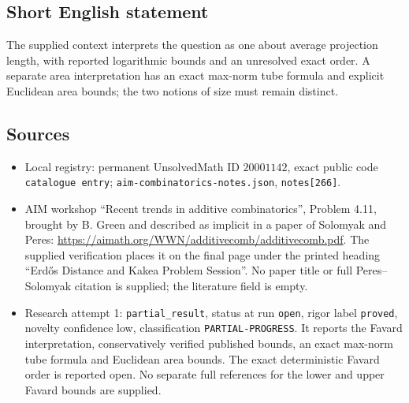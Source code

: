 \documentclass[11pt]{article}
\begin{document}
\subsection{Short English statement}
The supplied context interprets the question as one about average projection length, with reported logarithmic bounds and an unresolved exact order. A separate area interpretation has an exact max-norm tube formula and explicit Euclidean area bounds; the two notions of size must remain distinct.
\subsection{Sources}
\begin{itemize}
\item Local registry: permanent UnsolvedMath ID \(20001142\), exact public code \texttt{catalogue entry}; \texttt{aim-combinatorics-notes.json}, \texttt{notes[266]}.
\item AIM workshop ``Recent trends in additive combinatorics'', Problem 4.11, brought by B. Green and described as implicit in a paper of Solomyak and Peres: \url{https://aimath.org/WWN/additivecomb/additivecomb.pdf}. The supplied verification places it on the final page under the printed heading ``Erdős Distance and Kakea Problem Session''. No paper title or full Peres--Solomyak citation is supplied; the literature field is empty.
\item Research attempt 1: \texttt{partial\_result}, status at run \texttt{open}, rigor label \texttt{proved}, novelty confidence low, classification \texttt{PARTIAL-PROGRESS}. It reports the Favard interpretation, conservatively verified published bounds, an exact max-norm tube formula and Euclidean area bounds. The exact deterministic Favard order is reported open. No separate full references for the lower and upper Favard bounds are supplied.
\end{itemize}
\end{document}
